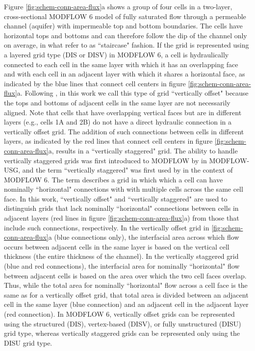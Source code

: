 \documentclass{article}
\begin{document}
Figure \ref{fig:schem-conn-area-flux}a shows a group of four cells in a two-layer, cross-sectional MODFLOW 6 model of fully saturated flow through a permeable channel (aquifer) with impermeable top and bottom boundaries. The cells have horizontal tops and bottoms and can therefore follow the dip of the channel only on average, in what \cite{bardot2022} refer to as ``staircase" fashion. If the grid is represented using a layered grid type (DIS or DISV) in MODFLOW 6, a cell is hydraulically connected to each cell in the same layer with which it has an overlapping face and with each cell in an adjacent layer with which it shares a horizontal face, as indicated by the blue lines that connect cell centers in figure \ref{fig:schem-conn-area-flux}a. Following \cite{bardot2022}, in this work we call this type of grid ``vertically offset" because the tops and bottoms of adjacent cells in the same layer are not necessarily aligned. Note that cells that have overlapping vertical faces but are in different layers (e.g., cells 1A and 2B) do not have a direct hydraulic connection in a vertically offset grid. The addition of such connections between cells in different layers, as indicated by the red lines that connect cell centers in figure \ref{fig:schem-conn-area-flux}a, results in a ``vertically staggered" grid. The ability to handle vertically staggered grids was first introduced to MODFLOW by \cite{modflowusg} in MODFLOW-USG, and the term ``vertically staggered" was first used by \cite{modflow6gwf} in the context of MODFLOW 6. The term describes a grid in which which a cell can have nominally ``horizontal" connections with with multiple cells across the same cell face. In this work, ``vertically offset" and ``vertically staggered" are used to distinguish grids that lack nominally ``horizontal" connections between cells in adjacent layers (red lines in figure \ref{fig:schem-conn-area-flux}a) from those that include such connections, respectively.  In the vertically offset grid in \ref{fig:schem-conn-area-flux}a (blue connections only), the interfacial area across which flow occurs between adjacent cells in the same layer is based on the vertical cell thickness (the entire thickness of the channel). In the vertically staggered grid (blue and red connections), the interfacial area for nominally ``horizontal" flow between adjacent cells is based on the area over which the two cell faces overlap. Thus, while the total area for nominally ``horizontal" flow across a cell face is the same as for a vertically offset grid, that total area is divided between an adjacent cell in the same layer (blue connection) and an adjacent cell in the adjacent layer (red connection). In MODFLOW 6, vertically offset grids can be represented using the structured (DIS), vertex-based (DISV), or fully unstructured (DISU) grid type, whereas vertically staggered grids can be represented only using the DISU grid type.
\end{document}
